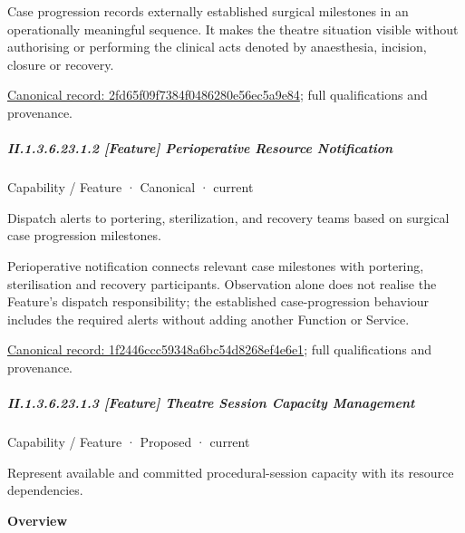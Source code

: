 Case progression records externally established surgical milestones in an operationally meaningful sequence. It makes the theatre situation visible without authorising or performing the clinical acts denoted by anaesthesia, incision, closure or recovery.


{\footnotesize \href{../../../../../../../continuum/strategy/capability/feature/2fd65f09f7384f0486280e56ec5a9e84.md}{Canonical record: 2fd65f09f7384f0486280e56ec5a9e84}; full qualifications and provenance.}\par
\subparagraph*{II.1.3.6.23.1.2 [Feature] Perioperative Resource Notification}
\label{navigation:II.1.3.6.23.1.2}

\label{element:1f2446ccc59348a6bc54d8268ef4e6e1}
{\small Capability / Feature · Canonical · current}\par

Dispatch alerts to portering, sterilization, and recovery teams based on surgical case progression milestones.



Perioperative notification connects relevant case milestones with portering, sterilisation and recovery participants. Observation alone does not realise the Feature's dispatch responsibility; the established case-progression behaviour includes the required alerts without adding another Function or Service.


{\footnotesize \href{../../../../../../../continuum/strategy/capability/feature/1f2446ccc59348a6bc54d8268ef4e6e1.md}{Canonical record: 1f2446ccc59348a6bc54d8268ef4e6e1}; full qualifications and provenance.}\par
\subparagraph*{II.1.3.6.23.1.3 [Feature] Theatre Session Capacity Management}
\label{navigation:II.1.3.6.23.1.3}

\label{element:258c27077caf4bf88e562e8dd607bdfd}
{\small Capability / Feature · Proposed · current}\par

Represent available and committed procedural-session capacity with its resource dependencies.



\textbf{Overview}



